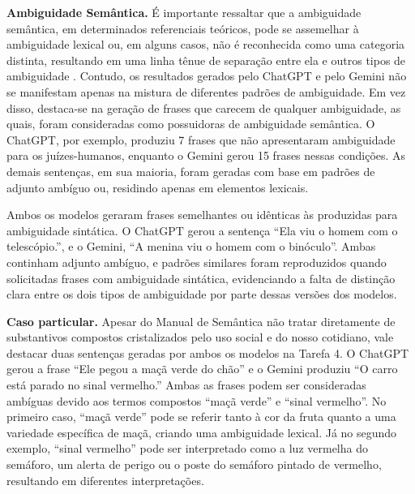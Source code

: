 \textbf{Ambiguidade Semântica.}
É importante ressaltar que a ambiguidade semântica, em determinados referenciais teóricos, pode se assemelhar à ambiguidade lexical ou, em alguns casos, não é reconhecida como uma categoria distinta, resultando em uma linha tênue de separação entre ela e outros tipos de ambiguidade \cite{zavaglia2003ambiguidade}. Contudo, os resultados gerados pelo ChatGPT e pelo Gemini não se manifestam apenas na mistura de diferentes padrões de ambiguidade. Em vez disso, destaca-se na geração de frases que carecem de qualquer ambiguidade, as quais, foram consideradas como possuidoras de ambiguidade semântica. O ChatGPT, por exemplo, produziu 7 frases que não apresentaram ambiguidade para os juízes-humanos, enquanto o Gemini gerou 15 frases nessas condições. As demais sentenças, em sua maioria, foram geradas com base em padrões de adjunto ambíguo ou, residindo apenas em elementos lexicais.

Ambos os modelos geraram frases semelhantes ou idênticas às produzidas para ambiguidade sintática. O ChatGPT gerou a sentença \enquote{Ela viu o homem com o telescópio.}, e o Gemini, \enquote{A menina viu o homem com o binóculo}. Ambas continham adjunto ambíguo, e padrões similares foram reproduzidos quando solicitadas frases com ambiguidade sintática, evidenciando a falta de distinção clara entre os dois tipos de ambiguidade por parte dessas versões dos modelos.

\textbf{Caso particular.} Apesar do Manual de Semântica \cite{canccado2005manual} não tratar diretamente de substantivos compostos cristalizados pelo uso social e do nosso cotidiano, vale destacar duas sentenças geradas por ambos os modelos na Tarefa 4. O ChatGPT gerou a frase \enquote{Ele pegou a maçã verde do chão} e o Gemini produziu \enquote{O carro está parado no sinal vermelho.} Ambas as frases podem ser consideradas ambíguas devido aos termos compostos \enquote{maçã verde} e \enquote{sinal vermelho}. No primeiro caso, \enquote{maçã verde} pode se referir tanto à cor da fruta quanto a uma variedade específica de maçã, criando uma ambiguidade lexical. Já no segundo exemplo, \enquote{sinal vermelho} pode ser interpretado como a luz vermelha do semáforo, um alerta de perigo ou o poste do semáforo pintado de vermelho, resultando em diferentes interpretações.  


